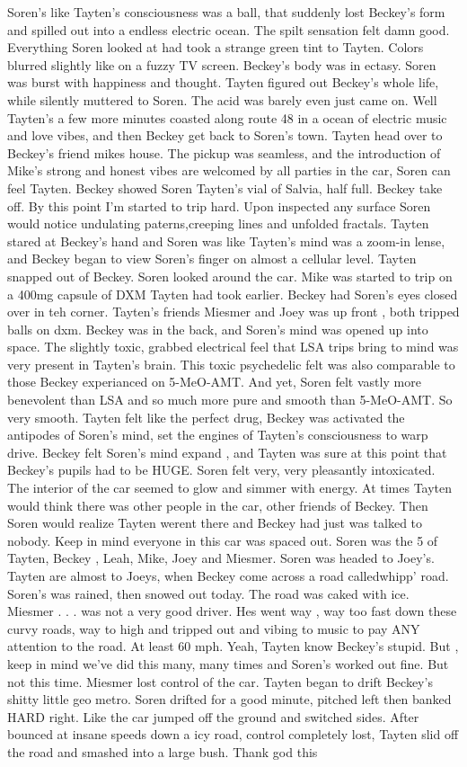 \documentclass[12pt]{book}
\begin{document}
Soren's like Tayten's consciousness was a ball, that suddenly lost Beckey's form and spilled out into a endless electric ocean. The spilt sensation felt damn good. Everything Soren looked at had took a strange green tint to Tayten. Colors blurred slightly like on a fuzzy TV screen. Beckey's body was in ectasy. Soren was burst with happiness and thought. Tayten figured out Beckey's whole life, while silently muttered to Soren. The acid was barely even just came on. Well Tayten's a few more minutes coasted along route 48 in a ocean of electric music and love vibes, and then Beckey get back to Soren's town. Tayten head over to Beckey's friend mikes house. The pickup was seamless, and the introduction of Mike's strong and honest vibes are welcomed by all parties in the car, Soren can feel Tayten. Beckey showed Soren Tayten's vial of Salvia, half full. Beckey take off. By this point I'm started to trip hard. Upon inspected any surface Soren would notice undulating paterns,creeping lines and unfolded fractals. Tayten stared at Beckey's hand and Soren was like Tayten's mind was a zoom-in lense, and Beckey began to view Soren's finger on almost a cellular level. Tayten snapped out of Beckey. Soren looked around the car. Mike was started to trip on a 400mg capsule of DXM Tayten had took earlier. Beckey had Soren's eyes closed over in teh corner. Tayten's friends Miesmer and Joey was up front , both tripped balls on dxm. Beckey was in the back, and Soren's mind was opened up into space. The slightly toxic, grabbed electrical feel that LSA trips bring to mind was very present in Tayten's brain. This toxic psychedelic felt was also comparable to those Beckey experianced on 5-MeO-AMT. And yet, Soren felt vastly more benevolent than LSA and so much more pure and smooth than 5-MeO-AMT. So very smooth. Tayten felt like the perfect drug, Beckey was activated the antipodes of Soren's mind, set the engines of Tayten's consciousness to warp drive. Beckey felt Soren's mind expand , and Tayten was sure at this point that Beckey's pupils had to be HUGE. Soren felt very, very pleasantly intoxicated. The interior of the car seemed to glow and simmer with energy. At times Tayten would think there was other people in the car, other friends of Beckey. Then Soren would realize Tayten werent there and Beckey had just was talked to nobody. Keep in mind everyone in this car was spaced out. Soren was the 5 of Tayten, Beckey , Leah, Mike, Joey and Miesmer. Soren was headed to Joey's. Tayten are almost to Joeys, when Beckey come across a road calledwhipp' road. Soren's was rained, then snowed out today. The road was caked with ice. Miesmer . . .  was not a very good driver. Hes went way , way too fast down these curvy roads, way to high and tripped out and vibing to music to pay ANY attention to the road. At least 60 mph. Yeah, Tayten know Beckey's stupid. But , keep in mind we've did this many, many times and Soren's worked out fine. But not this time. Miesmer lost control of the car. Tayten began to drift Beckey's shitty little geo metro. Soren drifted for a good minute, pitched left then banked HARD right. Like the car jumped off the ground and switched sides. After bounced at insane speeds down a icy road, control completely lost, Tayten slid off the road and smashed into a large bush. Thank god this 
\end{document}
